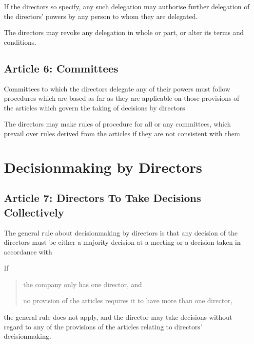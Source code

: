 \documentclass[letterpaper,10pt,english]{sphinxmanual}
\begin{document}
 If the directors so specify, any such delegation may authorise further delegation of the directors’ powers by any person to whom they are delegated.

 The directors may revoke any delegation in whole or part, or alter its terms and conditions.


\subsection{Article 6: Committees}
\label{\detokenize{directors:article-6-committees}}\label{\detokenize{directors:article-6}}
 Committees to which the directors delegate any of their powers must follow procedures which are based as far as they are applicable on those provisions of the articles which govern the taking of decisions by directors

 The directors may make rules of procedure for all or any committees, which prevail over rules derived from the articles if they are not consistent with them


\section{Decisionmaking by Directors}
\label{\detokenize{directors:decisionmaking-by-directors}}

\subsection{Article 7: Directors To Take Decisions Collectively}
\label{\detokenize{directors:article-7-directors-to-take-decisions-collectively}}\label{\detokenize{directors:article-7}}
 The general rule about decisionmaking by directors is that any decision of the directors must be either a majority decision at a meeting or a decision taken in accordance with {\hyperref[\detokenize{directors:article-8}]{}}

 If
\begin{quote}

 the company only has one director, and

 no provision of the articles requires it to have more than one director,
\end{quote}

the general rule does not apply, and the director may take decisions without regard to any of the provisions of the articles relating to directors’ decisionmaking.
\end{document}
